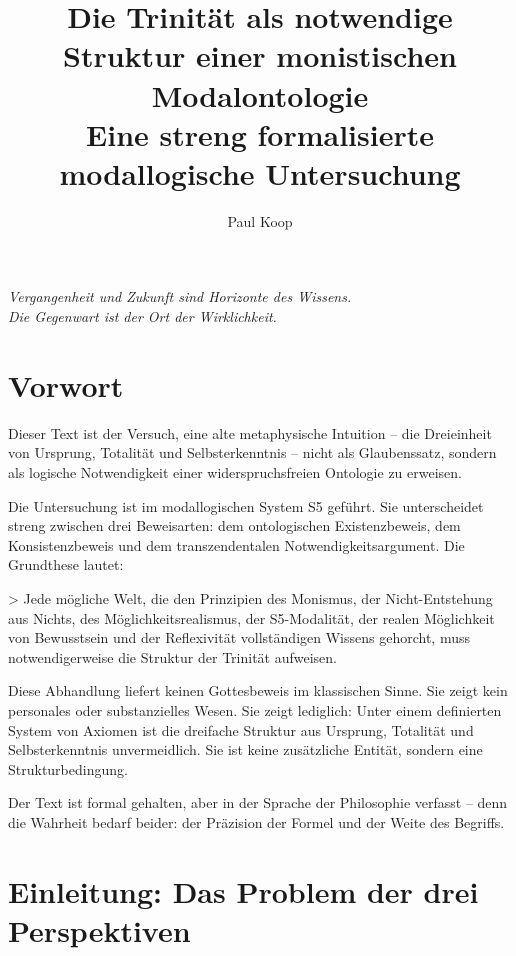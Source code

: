 \documentclass[
]{article}
\title{Die Trinität als notwendige Struktur einer monistischen Modalontologie \\ \large Eine streng formalisierte modallogische Untersuchung}
\author{Paul Koop}
\date{}
\begin{document}
\maketitle

\begin{center}
\emph{Vergangenheit und Zukunft sind Horizonte des Wissens. \\ Die Gegenwart ist der Ort der Wirklichkeit.}
\end{center}

\newpage
{
\setcounter{tocdepth}{3}
\tableofcontents
}
\newpage

\section{Vorwort}\label{vorwort}

Dieser Text ist der Versuch, eine alte metaphysische Intuition -- die Dreieinheit von Ursprung, Totalität und Selbsterkenntnis -- nicht als Glaubenssatz, sondern als logische Notwendigkeit einer widerspruchsfreien Ontologie zu erweisen.

Die Untersuchung ist im modallogischen System S5 geführt. Sie unterscheidet streng zwischen drei Beweisarten: dem ontologischen Existenzbeweis, dem Konsistenzbeweis und dem transzendentalen Notwendigkeitsargument. Die Grundthese lautet:

> Jede mögliche Welt, die den Prinzipien des Monismus, der Nicht-Entstehung aus Nichts, des Möglichkeitsrealismus, der S5-Modalität, der realen Möglichkeit von Bewusstsein und der Reflexivität vollständigen Wissens gehorcht, muss notwendigerweise die Struktur der Trinität aufweisen.

Diese Abhandlung liefert keinen Gottesbeweis im klassischen Sinne. Sie zeigt kein personales oder substanzielles Wesen. Sie zeigt lediglich: Unter einem definierten System von Axiomen ist die dreifache Struktur aus Ursprung, Totalität und Selbsterkenntnis unvermeidlich. Sie ist keine zusätzliche Entität, sondern eine Strukturbedingung.

Der Text ist formal gehalten, aber in der Sprache der Philosophie verfasst -- denn die Wahrheit bedarf beider: der Präzision der Formel und der Weite des Begriffs.

\section{Einleitung: Das Problem der drei Perspektiven}\label{einleitung-das-problem-der-drei-perspektiven}
\end{document}
